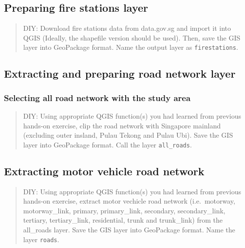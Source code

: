 \documentclass[
  letterpaper,
  DIV=11,
  numbers=noendperiod]{scrreprt}
\begin{document}
\hypertarget{preparing-fire-stations-layer}{%
\subsection{Preparing fire stations
layer}\label{preparing-fire-stations-layer}}

\begin{quote}
DIY: Download fire stations data from data.gov.sg and import it into
QGIS (Ideally, the shapefile version should be used). Then, save the GIS
layer into GeoPackage format. Name the output layer as
\texttt{firestations}.
\end{quote}

\hypertarget{extracting-and-preparing-road-network-layer-2}{%
\subsection{Extracting and preparing road network
layer}\label{extracting-and-preparing-road-network-layer-2}}

\hypertarget{selecting-all-road-network-with-the-study-area-2}{%
\subsubsection{Selecting all road network with the study
area}\label{selecting-all-road-network-with-the-study-area-2}}

\begin{quote}
DIY: Using appropriate QGIS function(s) you had learned from previous
hands-on exercise, clip the road network with Singapore mainland
(excluding outer insland, Pulau Tekong and Pulau Ubi). Save the GIS
layer into GeoPackage format. Call the layer \texttt{all\_roads}.
\end{quote}

\hypertarget{extracting-motor-vehicle-road-network-2}{%
\subsection{Extracting motor vehicle road
network}\label{extracting-motor-vehicle-road-network-2}}

\begin{quote}
DIY: Using appropriate QGIS function(s) you had learned from previous
hands-on exercise, extract motor vechicle road network (i.e.~motorway,
motorway\_link, primary, primary\_link, secondary, secondary\_link,
tertiary, tertiary\_link, residential, trunk and trunk\_link) from the
all\_roads layer. Save the GIS layer into GeoPackage format. Name the
layer \texttt{roads}.
\end{quote}
\end{document}
